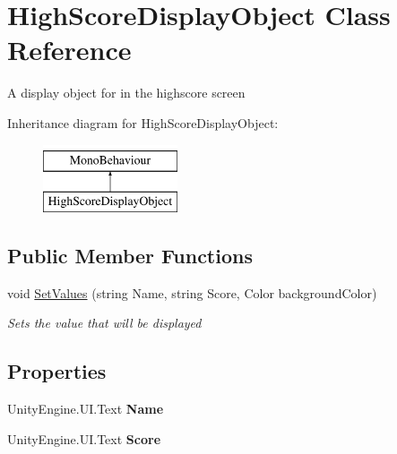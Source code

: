 \hypertarget{class_high_score_display_object}{}\section{High\+Score\+Display\+Object Class Reference}
\label{class_high_score_display_object}


A display object for in the highscore screen  


Inheritance diagram for High\+Score\+Display\+Object\+:\begin{figure}[H]
\begin{center}
\leavevmode
\includegraphics[height=2.000000cm]{class_high_score_display_object}
\end{center}
\end{figure}
\subsection*{Public Member Functions}
\begin{DoxyCompactItemize}
\item 
void \hyperlink{class_high_score_display_object_a730097662a82965ca0698dd30a31b00f}{Set\+Values} (string Name, string Score, Color background\+Color)
\begin{DoxyCompactList}\small\item\em Sets the value that will be displayed \end{DoxyCompactList}\end{DoxyCompactItemize}
\subsection*{Properties}
\begin{DoxyCompactItemize}
\item 
Unity\+Engine.\+U\+I.\+Text {\bfseries Name}\hypertarget{class_high_score_display_object_a76d9810d929c244d7f124fe1fde7686c}{}\label{class_high_score_display_object_a76d9810d929c244d7f124fe1fde7686c}

\item 
Unity\+Engine.\+U\+I.\+Text {\bfseries Score}\hypertarget{class_high_score_display_object_aef245c441d014407c7733e3d730ccf7d}{}\label{class_high_score_display_object_aef245c441d014407c7733e3d730ccf7d}

\end{DoxyCompactItemize}


